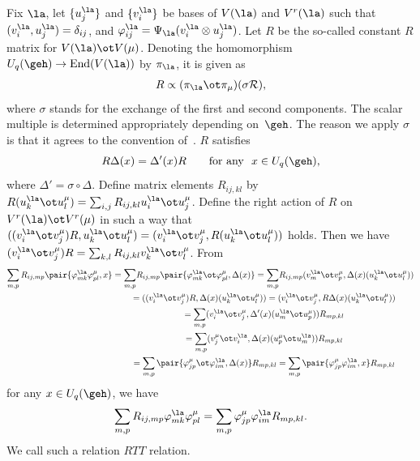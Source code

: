Fix $\la$, let $\{u^\la_j\}$ and $\{v^\la_i\}$ be bases of $V(\la)$ and $V^r(\la)$ such that
$(v^\la_i,u^\la_j)=\delta_{ij}$, and $\varphi^\la_{ij}=\Psi_\la(v^\la_i \otimes u^\la_j)$. Let $R$ be the
so-called constant $R$ matrix for $V(\la)\ot V(\mu)$. Denoting the homomorphism $U_q(\geh)\rightarrow
\mathrm{End}(V(\la))$ by $\pi_\la$, it is given as
\begin{gather}\label{eq:constR}
R\propto(\pi_\la\ot\pi_\mu)(\sigma\mathcal{R}),
\end{gather}
where $\sigma$ stands for the exchange of the f\/irst and second components.
The scalar multiple is determined appropriately depending on~$\geh$. The reason we apply $\sigma$
is that it agrees to the convention of~\cite{RTF}. $R$ satisf\/ies
\[
R\Delta(x)=\Delta'(x)R\qquad\text{for any} \ \ x\in U_q(\geh),
\]
where $\Delta'=\sigma\circ\Delta$.
Def\/ine matrix elements $R_{ij,kl}$ by $R(u^\la_k\ot u^\mu_l)=\sum_{i,j}R_{ij,kl}u^\la_i\ot u^\mu_j$.
Def\/ine the right action of $R$ on $V^r(\la)\ot V^r(\mu)$ in such a way that
$((v^\la_i\ot v^\mu_j)R,u^\la_k\ot u^\mu_l)=(v^\la_i\ot v^\mu_j,R(u^\la_k\ot u^\mu_l))$
holds. Then we have $(v^\la_i\ot v^\mu_j)R=\sum_{k,l}R_{ij,kl}v^\la_k\ot v^\mu_l$. From
\begin{gather*}
\sum_{m,p}R_{ij,mp}\pair{\varphi^\la_{mk}\varphi^\mu_{pl},x}
 = \sum_{m,p}\! R_{ij,mp}\pair{\varphi^\la_{mk}\ot\varphi^\mu_{pl},\Delta(x)}
 =\sum_{m,p} \! R_{ij,mp}(v^\la_m\ot v^\mu_p,\Delta(x)(u^\la_k\ot u^\mu_l))\\
 \hphantom{\sum_{m,p}R_{ij,mp}\pair{\varphi^\la_{mk}\varphi^\mu_{pl},x}}{}
 =((v^\la_i\ot v^\mu_j)R,\Delta(x)(u^\la_k\ot u^\mu_l))
 =(v^\la_i\ot v^\mu_j,R\Delta(x)(u^\la_k\ot u^\mu_l))\\
 \hphantom{\sum_{m,p}R_{ij,mp}\pair{\varphi^\la_{mk}\varphi^\mu_{pl},x}}{}
 =\sum_{m,p}(v^\la_i\ot v^\mu_j,\Delta'(x)(u^\la_m\ot u^\mu_p))R_{mp,kl}\\
\hphantom{\sum_{m,p}R_{ij,mp}\pair{\varphi^\la_{mk}\varphi^\mu_{pl},x}}{}
 =\sum_{m,p}(v^\mu_j\ot v^\la_i,\Delta(x)(u^\mu_p\ot u^\la_m))R_{mp,kl}\\
 \hphantom{\sum_{m,p}R_{ij,mp}\pair{\varphi^\la_{mk}\varphi^\mu_{pl},x}}{}
 =\sum_{m,p}\pair{\varphi^\mu_{jp}\ot\varphi^\la_{im},\Delta(x)}R_{mp,kl}
=\sum_{m,p}\pair{\varphi^\mu_{jp}\varphi^\la_{im},x}R_{mp,kl}
\end{gather*}
for any $x \in U_q(\geh)$, we have
\begin{gather}\label{eq:RTT}
\sum_{m,p}R_{ij,mp}\varphi^\la_{mk}\varphi^\mu_{pl}=\sum_{m,p}\varphi^\mu_{jp}\varphi^\la_{im}R_{mp,kl}.
\end{gather}
We call such a relation $RTT$ relation.

